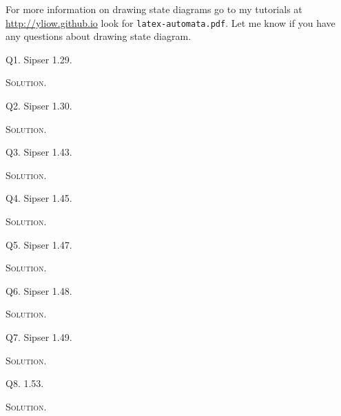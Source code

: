 For more information on drawing state diagrams go to my tutorials
at \url{http://yliow.github.io}
look for \verb!latex-automata.pdf!.
Let me know if you have any questions about drawing state diagram.

\newpage
Q1. Sipser 1.29.

\textsc{Solution}.



\newpage
Q2. Sipser 1.30.

\textsc{Solution}.



\newpage
Q3. Sipser 1.43.

\textsc{Solution}.



\newpage
Q4. Sipser 1.45.

\textsc{Solution}.



\newpage
Q5. Sipser 1.47.

\textsc{Solution}.



\newpage
Q6. Sipser 1.48.

\textsc{Solution}.



\newpage
Q7. Sipser 1.49.

\textsc{Solution}.



\newpage
Q8. 1.53.

\textsc{Solution}.





